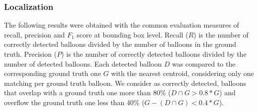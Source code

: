 \documentclass[conference]{IEEEtran}
\begin{document}
\subsubsection{Localization}
The following results were obtained with the common evaluation measures of recall, precision and $F_1$ score at bounding box level.
Recall ($R$) is the number of correctly detected balloons divided by the number of balloons in the ground truth.
Precision ($P$) is the number of correctly detected balloons divided by the number of detected balloons.
Each detected balloon $D$ was compared to the corresponding ground truth one $G$ with the nearest centroid, considering only one matching per ground truth balloon.
We consider as correctly detected, balloons that overlap with a ground truth one more than 80\% ($D \cap G > 0.8 * G$) and overflow the ground truth one less than 40\% ($G - (D \cap G) < 0.4 * G$).





	
\end{document}
